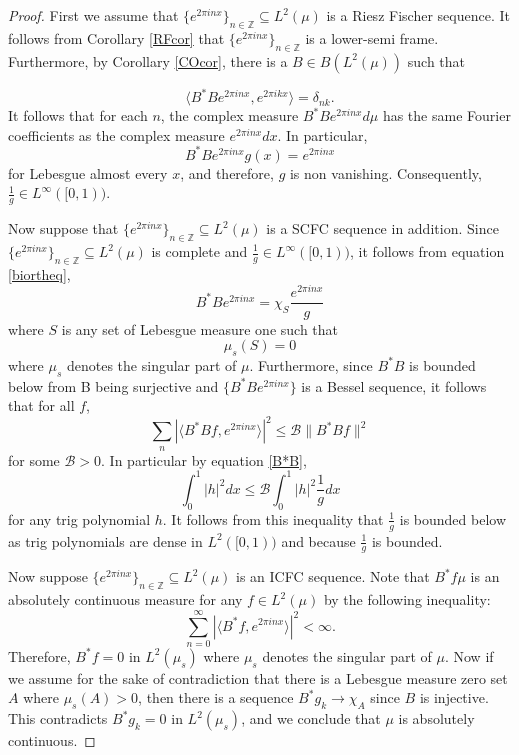 \documentclass[11pt]{amsart}
\theoremstyle{definition}
\numberwithin{equation}{section}
\begin{document}
\begin{proof}
First we assume that $\{e^{2\pi i nx}\}_{n\in \mathbb{Z}}\subseteq L^2(\mu)$ is a Riesz Fischer sequence. It follows from Corollary \ref{RFcor} that $\{e^{2\pi i nx}\}_{n\in \mathbb{Z}}$ is a lower-semi frame. Furthermore, by Corollary \ref{COcor}, there is a $B\in B(L^2(\mu))$ such that 

\begin{equation}\label{biortheq}
\langle B^{*}Be^{2\pi inx},e^{2\pi ikx}\rangle=\delta_{nk}.\end{equation}
It follows that for each $n$, the complex measure $B^{*}Be^{2\pi i nx}d\mu$ has the same Fourier coefficients as the complex measure $e^{2\pi i nx} dx$. In particular, 
$$B^{*}Be^{2\pi inx}g(x)=e^{2\pi inx}$$ for Lebesgue almost every $x$, and therefore,
$g$ is non vanishing. Consequently, $\frac{1}{g}\in L^{\infty}([0,1))$.

Now suppose that $\{e^{2\pi i nx}\}_{n\in \mathbb{Z}}\subseteq L^2(\mu)$ is a SCFC sequence in addition. Since $\{e^{2\pi i nx}\}_{n\in \mathbb{Z}}\subseteq L^2(\mu)$ is complete and $\frac{1}{g}\in L^{\infty}([0,1))$, it follows from equation \ref{biortheq},
\begin{equation}\label{B*B}
B^{*}Be^{2\pi inx}=\chi_{S}\dfrac{e^{2\pi i nx}}{g}   
\end{equation}
where $S$ is any set of Lebesgue measure one such that $$\mu_{s}(S)=0$$ where $\mu_{s}$ denotes the singular part of $\mu$. Furthermore, since $B^{*}B$ is bounded below from B being surjective and $\{B^{*}Be^{2\pi inx}\}$ is a Bessel sequence, it follows that for all $f$,
$$\sum_{n}|\langle B^{*}Bf, e^{2\pi i nx}\rangle|^2\leq \mathcal{B} \|B^{*}Bf\|^2$$ for some $\mathcal{B}>0$. 
In particular by equation \ref{B*B},
$$\int_{0}^{1}|h|^2dx\leq \mathcal{B}\int_{0}^{1}|h|^2\frac{1}{g}dx $$
for any trig polynomial $h$. It follows from this inequality that $\frac{1}{g}$ is bounded below as trig polynomials are dense in $L^{2}([0,1))$ and because $\frac{1}{g}$ is bounded.

Now suppose $\{e^{2\pi i nx}\}_{n\in \mathbb{Z}}\subseteq L^2(\mu)$ is an ICFC sequence. Note that $B^{*}f \mu$ is an absolutely continuous measure for any $f\in L^2(\mu)$ by the following inequality:
$$\sum_{n=0}^{\infty}|\langle B^{*}f, e^{2\pi i nx}\rangle |^{2}<\infty.$$
Therefore, $B^{*}f=0$ in $L^2(\mu_{s})$ where $\mu_{s}$ denotes the singular part of $\mu$. Now if we assume for the sake of contradiction that there is a Lebesgue measure zero set $A$ where $\mu_{s}(A)>0$, then there is a sequence $B^{*}g_k\to \chi_{A}$ since $B$ is injective. This contradicts $B^{*}g_k=0$ in $L^2(\mu_{s})$, and we conclude that $\mu$ is absolutely continuous.


\end{proof}
\end{document}
